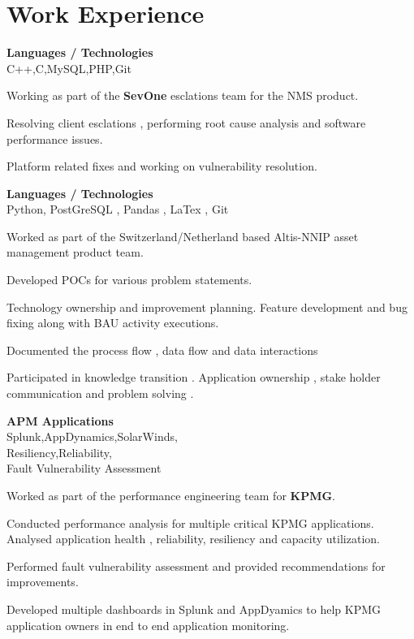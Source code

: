 \documentclass[a4,10pt]{cv4tw}
\begin{document}
\section{Work Experience}
{\textbf{Languages / Technologies} \\C++,C,MySQL,PHP,Git}
	{
	\begin{missions}
    \item Working as part of the \textbf{SevOne} esclations team for the NMS product.
	  \item Resolving client esclations , performing root cause analysis and software performance issues.
	  \item Platform related fixes and working on vulnerability resolution.
	\end{missions}
}
{\textbf{Languages / Technologies} \\Python, PostGreSQL , Pandas , LaTex , Git}
	{
	\begin{missions}
  \item Worked as part of the Switzerland/Netherland based Altis-NNIP asset management product team.
  \item Developed POCs for various problem statements.
  \item Technology ownership and improvement planning. Feature development and bug fixing along with  BAU activity executions.
  \item Documented the process flow , data flow and data interactions
  \item Participated in knowledge transition . Application ownership , stake holder communication and problem solving .
	\end{missions}
}
{\textbf{APM Applications}  \\Splunk,AppDynamics,SolarWinds,\\Resiliency,Reliability,\\Fault Vulnerability Assessment}
	{
	\begin{missions}
  \item Worked as part of the performance engineering team for \textbf{KPMG}.
  \item Conducted performance analysis for multiple critical KPMG applications. Analysed  application health , reliability, resiliency and capacity utilization.
  \item Performed fault vulnerability assessment and provided recommendations for improvements.
  \item Developed multiple dashboards in Splunk and AppDyamics to help KPMG application owners in end to end application monitoring.
	\end{missions}
}
\end{document}
